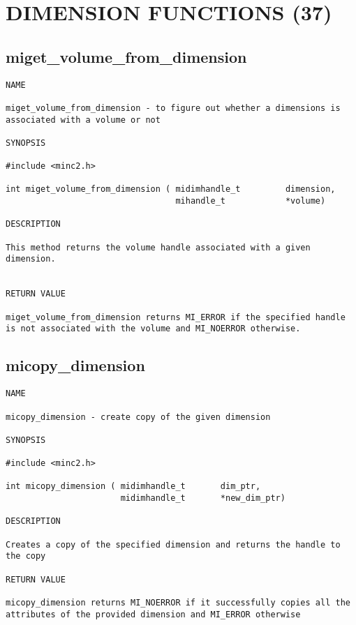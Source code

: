 \documentclass{article}
\begin{document}
\section{DIMENSION FUNCTIONS (37)}
\subsection{miget\_volume\_from\_dimension}
\begin{verbatim}
NAME 

miget_volume_from_dimension - to figure out whether a dimensions is
associated with a volume or not

SYNOPSIS

#include <minc2.h>

int miget_volume_from_dimension ( midimhandle_t         dimension,
                                  mihandle_t            *volume)
                                
DESCRIPTION

This method returns the volume handle associated with a given dimension.


RETURN VALUE

miget_volume_from_dimension returns MI_ERROR if the specified handle
is not associated with the volume and MI_NOERROR otherwise.
\end{verbatim}

\subsection{micopy\_dimension}
\begin{verbatim}
NAME

micopy_dimension - create copy of the given dimension

SYNOPSIS

#include <minc2.h>

int micopy_dimension ( midimhandle_t       dim_ptr,
                       midimhandle_t       *new_dim_ptr)

DESCRIPTION

Creates a copy of the specified dimension and returns the handle to the copy

RETURN VALUE

micopy_dimension returns MI_NOERROR if it successfully copies all the 
attributes of the provided dimension and MI_ERROR otherwise
\end{verbatim}
\end{document}
